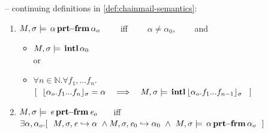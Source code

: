 
\begin{definition} 
\label{def:chainmail-protection-from}
\label{sect:semantics:assert:prtFrom}
-- continuing definitions in \ref{def:chainmail-semantics}:
\begin{enumerate}
\item
\label{cProtected}
 $M , \sigma \models {\ensuremath{\, {\alpha}\, \mathbf{prt\!\!-\!\!frm}}\, {\alpha_{o}}}$  \ \ \ \ iff  \ \ \ \ 
 $\alpha\neq \alpha_0$,
 \ \ \ \  and
  \begin{itemize}
 \item
 $M , \sigma \models {\ensuremath{\, \mathbf{intl}}\, \alpha_0\, }$
 \\
 or
 \item
$\forall n\in\mathbb{N}. \forall f_1,...f_n.$
$
[\ \ \interpret{\sigma}{\alpha_{o}.f_1...f_n}=\alpha \ \ \  \Longrightarrow \ \ \ \satisfiesA{M} {\sigma} {\internal{{\interpret{\sigma}{\alpha_{o}.f_1...f_{n-1}}}}}\ \ ]$
\end{itemize}
\item
$M , \sigma \models {\ensuremath{\, {\mathit{e}}\, \mathbf{prt\!\!-\!\!frm}}\, {\mathit{e}_{o}}}$  \ \ \ iff \\
  $\exists \alpha, \alpha_{o}. [\  \ \eval{M}{\sigma}{{\re}}{\alpha}\ \wedge \eval{M}{\sigma}{{\re_0}}{\alpha_0} \  \wedge \ 
  \satisfiesA{M}{\sigma}{\protectedFrom{{\alpha}} {{\alpha_{o}}}}
 \ \  ]$
 \end{enumerate}
 \end{definition} 
 

